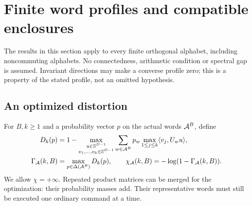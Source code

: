 \section{Finite word profiles and compatible enclosures}\label{sec:profiles}
The results in this section apply to every finite orthogonal alphabet, including noncommuting alphabets. No connectedness, arithmetic condition or spectral gap is assumed. Invariant directions may make a converse profile zero; this is a property of the stated profile, not an omitted hypothesis.

\subsection{An optimized distortion}
For $B,k\ge1$ and a probability vector $p$ on the actual words $\mathcal A^B$, define
\begin{align}
 D_k(p)&=1-\max_{\substack{u\in\mathbb S^{D-1}\\v_1,\ldots,v_k\in\mathbb S^{D-1}}}
       \sum_{w\in\mathcal A^B}p_w\max_{1\le j\le k}\langle v_j,U_wu\rangle,\label{eq:distortion43}\\
 \Gamma_{\mathcal A}(k,B)&=\max_{p\in\Delta(\mathcal A^B)}D_k(p),
 \qquad \chi_{\mathcal A}(k,B)=-\log(1-\Gamma_{\mathcal A}(k,B)).\label{eq:gamma43}
\end{align}
We allow $\chi=+\infty$. Repeated product matrices can be merged for the optimization: their probability masses add. Their representative words must still be executed one ordinary command at a time.

